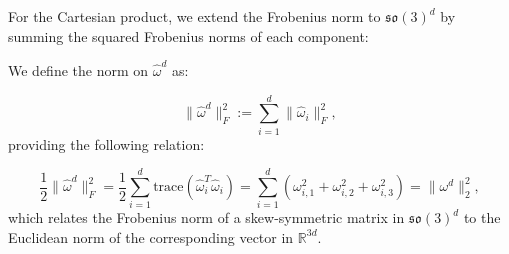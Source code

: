 
For the Cartesian product, we extend the Frobenius norm to \(\mathfrak{so}(3)^d\) by summing the squared Frobenius norms of each component:

We define the norm on \(\hat{\omega}^d\) as:

\begin{equation}
    \|\hat{\omega}^d\|_F^2 
    := 
    \sum_{i=1}^d \|\hat{\omega}_i\|_F^2, 
\end{equation}
providing the following relation: 

\begin{equation}
    \frac{1}{2}\|\hat{\omega}^d\|_F^2 
    = 
    \frac{1}{2} \sum_{i=1}^d \text{trace}(\hat{\omega}_i^T \hat{\omega}_i)
    =
    \sum_{i=1}^d (\omega_{i,1}^2 + \omega_{i,2}^2 + \omega_{i,3}^2)
    =
    \|\omega^d\|_2^2, 
    \label{eq:norm_SO3d}
\end{equation}
which relates the Frobenius norm of a skew-symmetric matrix in \( \mathfrak{so}(3)^d \) to the Euclidean norm of the corresponding vector in \( \mathbb{R}^{3d} \). 
